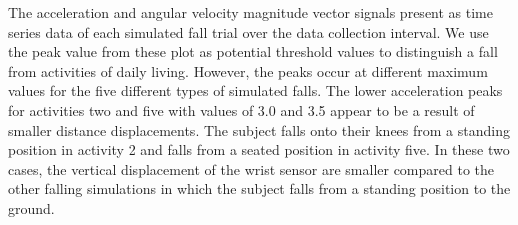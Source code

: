 \documentclass{llncs}
\begin{document}
	
	The acceleration and angular velocity magnitude vector signals present as time series data of each simulated fall trial over the data collection interval. We use the peak value from these plot as potential threshold values to distinguish a fall from activities of daily living. However, the peaks occur at different maximum values for the five different types of simulated falls. The lower acceleration peaks for activities two and five with values of 3.0 and 3.5 appear to be a result of smaller distance displacements. The subject falls onto their knees from a standing position in activity 2 and falls from a seated position in activity five. In these two cases, the vertical displacement of the wrist sensor are smaller compared to the other falling simulations in which the subject falls from a standing position to the ground.
	
\end{document}
